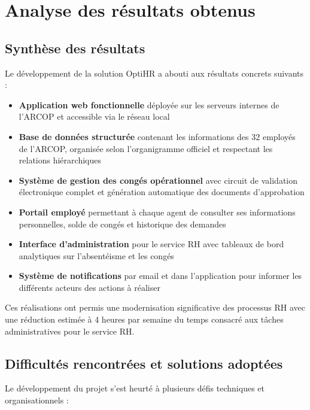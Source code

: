 \section{Analyse des résultats obtenus}

\subsection{Synthèse des résultats}
Le développement de la solution OptiHR a abouti aux résultats concrets suivants :

\begin{itemize}
    \item \textbf{Application web fonctionnelle} déployée sur les serveurs internes de l'ARCOP et accessible via le réseau local
    
    \item \textbf{Base de données structurée} contenant les informations des 32 employés de l'ARCOP, organisée selon l'organigramme officiel et respectant les relations hiérarchiques
    
    \item \textbf{Système de gestion des congés opérationnel} avec circuit de validation électronique complet et génération automatique des documents d'approbation
    
    \item \textbf{Portail employé} permettant à chaque agent de consulter ses informations personnelles, solde de congés et historique des demandes
    
    \item \textbf{Interface d'administration} pour le service RH avec tableaux de bord analytiques sur l'absentéisme et les congés
    
    \item \textbf{Système de notifications} par email et dans l'application pour informer les différents acteurs des actions à réaliser
\end{itemize}

Ces réalisations ont permis une modernisation significative des processus RH avec une réduction estimée à 4 heures par semaine du temps consacré aux tâches administratives pour le service RH.

\subsection{Difficultés rencontrées et solutions adoptées}
Le développement du projet s'est heurté à plusieurs défis techniques et organisationnels :

